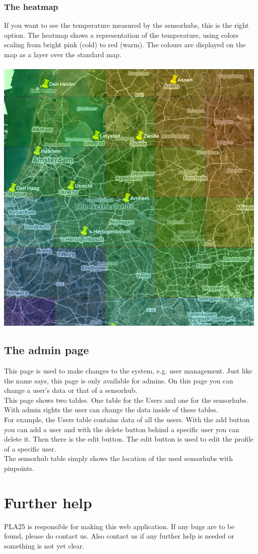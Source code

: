 \documentclass[a4paper]{article}
\begin{document}
\subsubsection{The heatmap}
If you want to see the temperature measured by the sensorhubs, this is the right option.
The heatmap shows a representation of the temperature, using colors scaling from bright pink (cold) to red (warm). The colours are displayed on the map as a layer over the standard map.
~\\\\
\noindent
\includegraphics[width=\textwidth]{kaart}
% 
% 

\pagebreak

\subsection{The admin page}
This page is used to make changes to the system, e.g. user management. Just like the name says, this page is only available for admins. On this page you can change a user's data or that of a sensorhub.
\\
This page shows two tables. One table for the Users and one for the sensorhubs. With admin rights the user can change the data inside of these tables.
\\
For example, the Users table contains data of all the users. With the add button you can add a user and with the delete button behind a specific user you can delete it. Then there is the edit button. The edit button is used to edit the profile of a specific user.
\\
The sensorhub table simply shows the location of the used sensorhubs with pinpoints.
~\\

\section{Further help}
PLA25 is responsible for making this web application. If any bugs are to be found, please do contact us.
Also contact us if any further help is needed or something is not yet clear.
\end{document}

